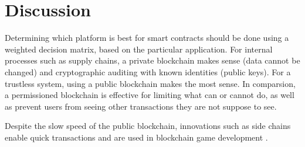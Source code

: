 	
\section{Discussion}

Determining which platform is best for smart contracts should be done using a weighted decision matrix, based on the particular application. For internal processes such as supply chains, a private blockchain makes sense (data cannot be changed) and cryptographic auditing with known identities (public keys). For a trustless system, using a public blockchain makes the most sense. In comparsion, a permissioned blockchain is effective for limiting what can or cannot do, as well as prevent users from seeing other transactions they are not suppose to see.

Despite the slow speed of the public blockchain, innovations such as \gls{side chains} enable quick transactions and are used in blockchain game development \cite{loomNetwork:Online}. %
